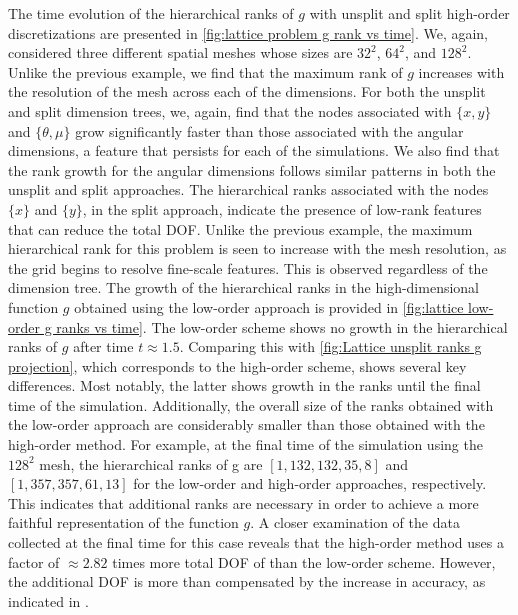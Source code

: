\documentclass[onefignum,onetabnum]{siamart220329}
\begin{document}
The time evolution of the hierarchical ranks of $g$ with unsplit and split high-order discretizations are presented in \cref{fig:lattice problem g rank vs time}. We, again, considered three different spatial meshes whose sizes are $32^{2}$, $64^{2}$, and $128^{2}$. Unlike the previous example, we find that the maximum rank of $g$ increases with the resolution of the mesh across each of the dimensions. For both the unsplit and split dimension trees, we, again, find that the nodes associated with $\{x,y\}$ and $\{\theta,\mu\}$ grow significantly faster than those associated with the angular dimensions, a feature that persists for each of the simulations. We also find that the rank growth for the angular dimensions follows similar patterns in both the unsplit and split approaches. The hierarchical ranks associated with the nodes $\{x\}$ and $\{y\}$, in the split approach, indicate the presence of low-rank features that can reduce the total DOF. Unlike the previous example, the maximum hierarchical rank for this problem is seen to increase with the mesh resolution, as the grid begins to resolve fine-scale features. This is observed regardless of the dimension tree. The growth of the hierarchical ranks in the high-dimensional function $g$ obtained using the low-order approach is provided in \cref{fig:lattice low-order g ranks vs time}. The low-order scheme shows no growth in the hierarchical ranks of $g$ after time $t \approx 1.5$. Comparing this with \cref{fig:Lattice unsplit ranks g projection}, which corresponds to the high-order scheme, shows several key differences. Most notably, the latter shows growth in the ranks until the final time of the simulation. Additionally, the overall size of the ranks obtained with the low-order approach are considerably smaller than those obtained with the high-order method. For example, at the final time of the simulation using the $128^{2}$ mesh, the hierarchical ranks of g are $[1,132,132,35,8]$ and $[1,357,357,61,13]$ for the low-order and high-order approaches, respectively. This indicates that additional ranks are necessary in order to achieve a more faithful representation of the function $g$. A closer examination of the data collected at the final time for this case reveals that the high-order method uses a factor of $\approx 2.82$ times more total DOF of than the low-order scheme. However, the additional DOF is more than compensated by the increase in accuracy, as indicated in .
\end{document}
